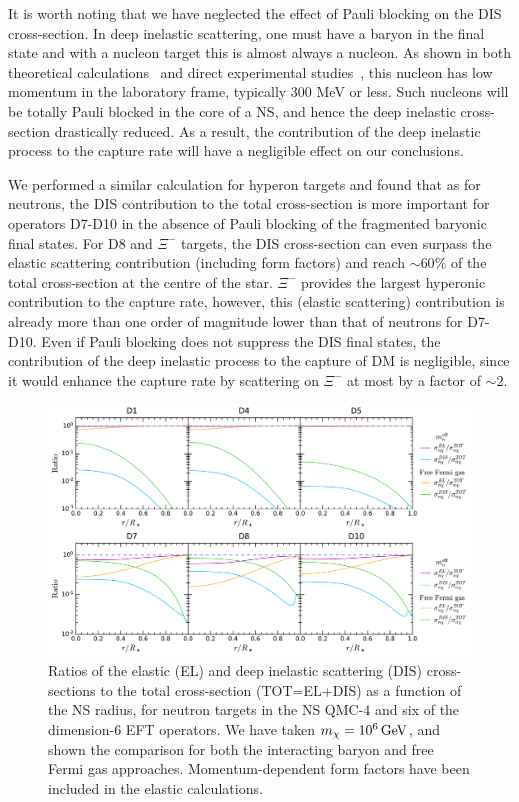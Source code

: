 It is worth noting that we have neglected the effect of Pauli blocking on the DIS cross-section. In deep inelastic scattering, one must have a baryon in the final state and with a nucleon target this is almost always a nucleon. As shown in both theoretical calculations~\cite{Melnitchouk:1992gd_Protonproductionbias} and direct experimental studies~\cite{BEBCWA59:1989ayi_Backwardparticleproduction}, this nucleon has low momentum in the laboratory frame, typically 300 MeV or less. Such nucleons will be totally Pauli blocked in the core of a NS, and hence the deep inelastic cross-section drastically reduced. 
As a result, the contribution of the deep inelastic process to the capture rate will have a negligible effect on our conclusions. 

We performed a similar calculation for hyperon targets and found that as for neutrons, the DIS contribution to the total cross-section is more important for operators D7-D10 in the absence of Pauli blocking of the fragmented baryonic final states. For D8 and  $\Xi^-$ targets, the DIS cross-section can even surpass the elastic scattering contribution (including form factors) and reach $\sim60\%$ of the total cross-section at the centre of the star.  $\Xi^-$ provides the largest hyperonic contribution to the capture rate, however, this (elastic scattering) contribution is already more than one order of magnitude lower than that of neutrons for D7-D10.  
Even if Pauli blocking does not suppress the DIS final states, the contribution of the deep inelastic process to the capture of DM is negligible, since it would enhance the capture rate by scattering on $\Xi^-$ at most by a factor of $\sim2$. 

\begin{figure}[t!bp]
    \centering
    \includegraphics[width=\textwidth]{capture_3/DIS_xsectot_ratio_PeV.pdf}
    \caption{Ratios of the elastic (EL) and deep inelastic scattering (DIS) cross-sections to the total cross-section (TOT=EL+DIS) as a function of the NS radius, for neutron targets in the NS QMC-4 and six of the dimension-6 EFT operators.  We have taken $m_\chi=10^6{\rm \,GeV}$, and shown the comparison for both the interacting baryon and free Fermi gas approaches. Momentum-dependent form factors have been included in the elastic calculations.  }  
    \label{ch5:fig:DISratio}
\end{figure}

